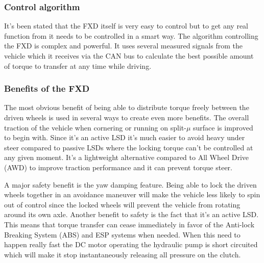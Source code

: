 \subsubsection{Control algorithm}
It's been stated that the FXD itself is very easy to control but to get any real function from it needs to be controlled in a smart way. The algorithm controlling the FXD is complex and powerful. It uses several measured signals from the vehicle which it receives via the CAN bus to calculate the best possible amount of torque to transfer at any time while driving. 

\subsubsection{Benefits of the FXD}
The most obvious benefit of being able to distribute torque freely between the driven wheels is used in several ways to create even more benefits. The overall traction of the vehicle when cornering or running on split-$ \mu $ surface is improved to begin with. Since it's an active LSD it's much easier to avoid heavy under steer compared to passive LSDs where the locking torque can't be controlled at any given moment. It's a lightweight alternative compared to All Wheel Drive (AWD) to improve traction performance and it can prevent torque steer.

A major safety benefit is the yaw damping feature. Being able to lock the driven wheels together in an avoidance maneuver will make the vehicle less likely to spin out of control since the locked wheels will prevent the vehicle from rotating around its own axle. Another benefit to safety is the fact that it's an active LSD. This means that torque transfer can cease immediately in favor of the Anti-lock Breaking System (ABS) and ESP systems when needed. When this need to happen really fast the DC motor operating the hydraulic pump is short circuited which will make it stop instantaneously releasing all pressure on the clutch. 